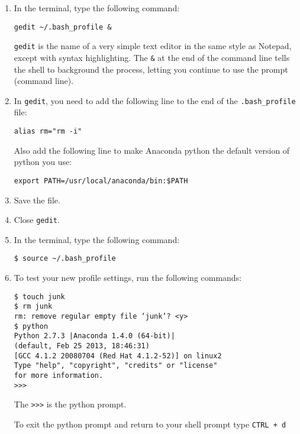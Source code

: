 \documentclass[12pt]{article}
\begin{document}
\begin{enumerate}

\item In the terminal, type the following command:
\begin{lstlisting}[style=bash]
gedit ~/.bash_profile &
\end{lstlisting}
\texttt{gedit} is the name of a very simple text editor in the same style as Notepad, except with syntax highlighting. The \texttt{\&} at the end of the command line tells the shell to background the process, letting you continue to use the prompt (command line).

\item In \texttt{gedit}, you need to add the following line to the end of the \texttt{.bash\_profile} file:
\begin{lstlisting}[style=c]
alias rm="rm -i"
\end{lstlisting}

Also add the following line to make Anaconda python the default version of python you use:
\begin{lstlisting}[style=c]
export PATH=/usr/local/anaconda/bin:$PATH
\end{lstlisting}

\item Save the file.

\item Close \texttt{gedit}.

\item In the terminal, type the following command:
\begin{lstlisting}[style=bash]
$ source ~/.bash_profile
\end{lstlisting}

\item To test your new profile settings, run the following commands:

\begin{lstlisting}[style=bash]
$ touch junk
$ rm junk
rm: remove regular empty file ‘junk’? <y>
$ python
Python 2.7.3 |Anaconda 1.4.0 (64-bit)| 
(default, Feb 25 2013, 18:46:31) 
[GCC 4.1.2 20080704 (Red Hat 4.1.2-52)] on linux2
Type "help", "copyright", "credits" or "license" 
for more information.
>>> 
\end{lstlisting}

The \texttt{>>>} is the python prompt.

To exit the python prompt and return to your shell prompt type \texttt{CTRL + d}

\end{enumerate}
\end{document}
